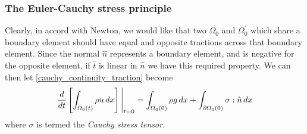 \subsubsection{The Euler-Cauchy stress principle}\label{stress_principle}
Clearly, in accord with Newton, we would like that two $\Omega_0$ and $\Omega_0^\prime$
which share a boundary element should have equal and opposite tractions across that boundary element.
Since the normal $\hat{n}$ represents a boundary element, and is negative for the opposite element, if $\hat{t}$ is linear in $\hat{n}$ we have this required
property. We can then let \eqref{cauchy_continuity_traction} become
\begin{equation}\label{cauchy_continuity}
    \eval{\frac{d}{dt}\left[\int_{\Omega_0(t)}\rho u\,dx\right]}_{t=0} = \int_{\omn(0)} \rho g\,dx + \int_{\pomn(0)}\sigma:\hat{n}\,dx
\end{equation}
where $\sigma$ is termed the \textit{Cauchy stress tensor}.


